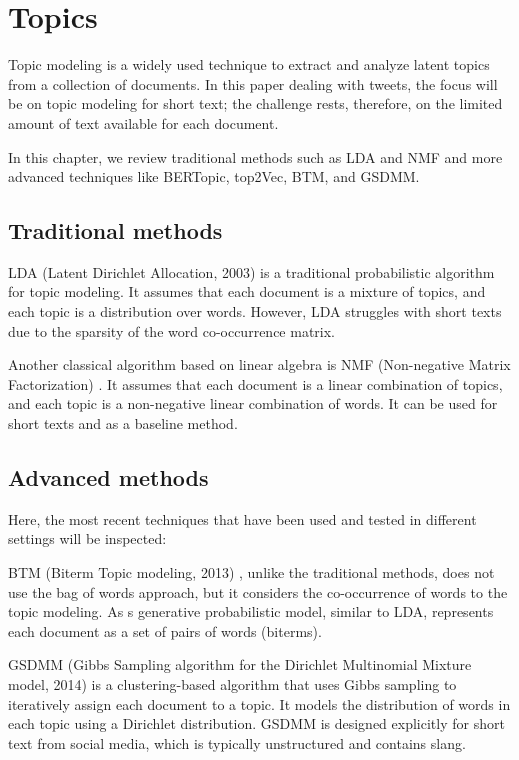\section[Topics]{Topics}
Topic modeling is a widely used technique to extract and analyze latent topics from a collection of documents. In this paper dealing with tweets, the focus will be on topic modeling for short text; the challenge rests, therefore, on the limited amount of text available for each document. 

In this chapter, we review traditional methods such as LDA and NMF and more advanced techniques like BERTopic, top2Vec, BTM, and GSDMM. 

\subsection{Traditional methods}
LDA (Latent Dirichlet Allocation, 2003)\cite{blei_latent_2003} is a traditional probabilistic algorithm for topic modeling. It assumes that each document is a mixture of topics, and each topic is a distribution over words. However, LDA struggles with short texts due to the sparsity of the word co-occurrence matrix.

Another classical algorithm based on linear algebra is NMF (Non-negative Matrix Factorization) \cite{lee_algorithms_2000}\cite{kuang_nonnegative_2015}. It assumes that each document is a linear combination of topics, and each topic is a non-negative linear combination of words. It can be used for short texts and as a baseline method.

\subsection{Advanced methods}
Here, the most recent techniques that have been used and tested in different settings will be inspected:

BTM (Biterm Topic modeling, 2013) \cite{yan_biterm_2013}, unlike the traditional methods, does not use the bag of words approach, but it considers the co-occurrence of words to the topic modeling. As s generative probabilistic model, similar to LDA, represents each document as a set of pairs of words (biterms).

GSDMM (Gibbs Sampling algorithm for the Dirichlet Multinomial Mixture model, 2014) \cite{yin_dirichlet_2014} is a clustering-based algorithm that uses Gibbs sampling to iteratively assign each document to a topic. It models the distribution of words in each topic using a Dirichlet distribution. GSDMM is designed explicitly for short text from social media, which is typically unstructured and contains slang.

